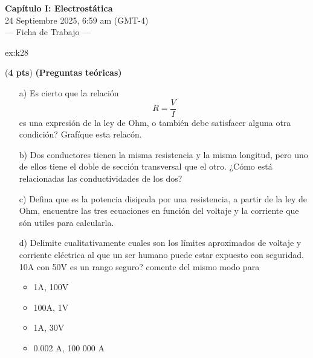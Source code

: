  \begin{multicols}{2}
   \begin{center}
         \LARGE{\textbf{Capítulo I: Electrostática}}\\	
         \vspace{0.2cm}
         \large{24 Septiembre 2025, 6:59 am (GMT-4)}\\
         \large{— Ficha de Trabajo —}
     \end{center}
    \begin{excercise}[][][]{ex:k28}{(\textbf{4 pts})
        \textbf{(Preguntas teóricas)}
        \begin{itemize}
            \item[a)] Es cierto que la relación 
                \begin{equation*}
                    R=\frac{V}{I}
                \end{equation*}
                es una expresión de la ley de Ohm, o también debe satisfacer alguna otra condición? Grafíque esta relacón. 
            \item[b)] Dos conductores tienen la misma resistencia y la misma longitud, pero uno de ellos tiene el doble de sección transversal que el otro. ¿Cómo está relacionadas las conductividades de los dos?
            \item[c)] Defina que es la potencia disipada por una resistencia, a partir de la ley de Ohm, encuentre las tres ecuaciones en función del voltaje y la corriente que són utiles para calcularla.
            \item[d)] Delimite cualitativamente cuales son los límites aproximados de voltaje y corriente eléctrica al que un ser humano puede estar expuesto con seguridad. 10A con 50V es un rango seguro? comente del mismo modo para 
                \begin{itemize}
                    \item 1A, 100V
                    \item 100A, 1V
                    \item 1A, 30V
                    \item 0.002 A, 100 000 A
                \end{itemize}
        \end{itemize}
         }
    \end{excercise}


\end{multicols}
